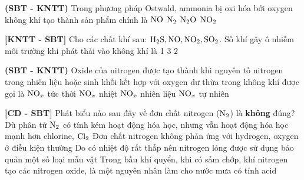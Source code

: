 \documentclass[12pt,a4paper]{article}
\begin{document}
\begin{ex}
\textbf{(SBT - KNTT)} Trong phương pháp Ostwald, ammonia bị oxi hóa bởi oxygen không khí tạo thành sản phẩm chính là
\choice
{\True $\ce{NO}$}
{$\ce{N2}$}
{$\ce{N2O}$}
{$\ce{NO2}$}

\end{ex}

\begin{ex}
\textbf{[KNTT - SBT]} Cho các chất khí sau: $\ce{H2S, NO, NO2, SO2}$. Số khí gây ô nhiễm môi trường khi phát thải vào không khí là
\choice
{1}
{}
{3}
{2}

\end{ex}

\begin{ex}
\textbf{(SBT - KNTT)} Oxide của nitrogen được tạo thành khi nguyên tố nitrogen trong nhiên liệu hoặc sinh khối kết hợp với oxygen dư thừa trong không khí được gọi là
\choice
{$\ce{NO_x}$ tức thời}
{$\ce{NO_x}$ nhiệt}
{\True $\ce{NO_x}$ nhiên liệu}
{$\ce{NO_x}$ tự nhiên}

\end{ex}

\begin{ex}
\textbf{[CD - SBT]} Phát biểu nào sau đây về đơn chất nitrogen ($\ce{N2}$) là \textbf{không} đúng?
\choice
{\True Dù phân tử $\ce{N2}$ có tính kém hoạt động hóa học, nhưng vẫn hoạt động hóa học mạnh hơn chlorine, $\ce{Cl2}$}
{Đơn chất nitrogen không phản ứng với hydrogen, oxygen ở điều kiện thường}
{Do có nhiệt độ rất thấp nên nitrogen lỏng được sử dụng bảo quản một số loại mẫu vật}
{Trong bầu khí quyển, khi có sấm chớp, khí nitrogen tạo các nitrogen oxide, là một nguyên nhân làm cho nước mưa có tính acid}

\end{ex}
\end{document}
